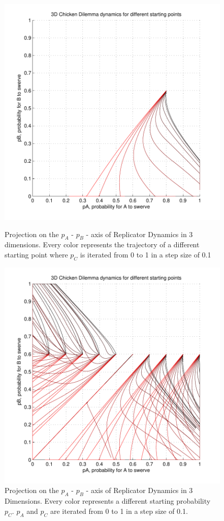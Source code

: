 \documentclass[11pt]{article}
\begin{document}
\begin{figure}[h]
\centering
\includegraphics[scale=0.69]{ReplicatorDynamics3Dimensions1.pdf}


\caption[Replicator Dynamics in 3 Dimensions]{Projection on the $p_A$ - $p_B$ - axis of Replicator Dynamics in 3 dimensions. Every color represents the trajectory of a different starting point where $p_C$ is iterated from 0 to 1 in a step size of 0.1}
\label{Rep32}

\includegraphics[scale=0.69]{ReplicatorDynamics3Dimensions3.pdf}
\caption[Replicator Dynamics in 3 Dimensions]{Projection on the $p_A$ - $p_B$ - axis of Replicator Dynamics in 3 Dimensions. Every color represents a different starting probability $p_C$. $p_A$ and $p_C$ are iterated from 0 to 1 in a step size of 0.1. }
\label{Rep33}

\end{figure}
\end{document}
